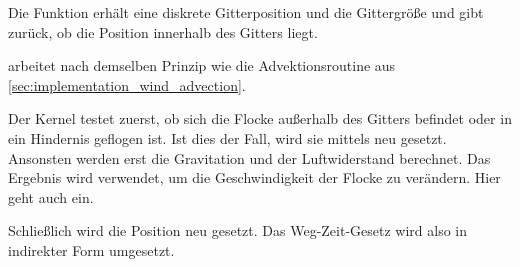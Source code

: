 Die Funktion  erhält eine diskrete
Gitterposition und die Gittergröße und gibt zurück, ob die Position
innerhalb des Gitters liegt.

 arbeitet nach
demselben Prinzip wie die Advektionsroutine aus
\autoref{sec:implementation_wind_advection}.

Der Kernel testet zuerst, ob sich die Flocke außerhalb des Gitters
befindet oder in ein Hindernis geflogen ist. Ist dies der Fall, wird
sie mittels  neu gesetzt. Ansonsten
werden erst die Gravitation und der Luftwiderstand berechnet. Das
Ergebnis wird verwendet, um die Geschwindigkeit der Flocke zu
verändern. Hier geht auch  ein.

Schließlich wird die Position neu gesetzt. Das Weg-Zeit-Gesetz wird
also in indirekter Form umgesetzt.
